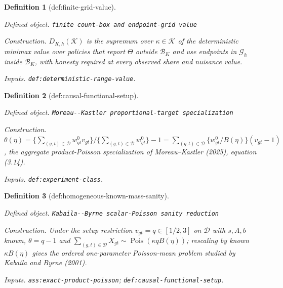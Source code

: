 \documentclass{article}
\newtheorem{definition}{Definition}
\begin{document}
\begin{definition}[def:finite-grid-value]\label{def:finite-grid-value}
\par\smallskip\noindent\emph{Defined object.} \texttt{finite count-\allowbreak{}box and endpoint-\allowbreak{}grid value}
\par\smallskip\noindent\emph{Construction.} \(D_{K,h}(\mathcal K)\) is the supremum over \(\kappa\in\mathcal K\) of the deterministic minimax value over policies that report \(\Theta\) outside \(\mathcal B_K\) and use endpoints in \(\mathcal G_h\) inside \(\mathcal B_K\), with honesty required at every observed share and nuisance value.
\par\smallskip\noindent\emph{Inputs.} \texttt{def:\allowbreak{}deterministic-\allowbreak{}range-\allowbreak{}value}.
\end{definition}

\begin{definition}[def:causal-functional-setup]\label{def:causal-functional-setup}
\par\smallskip\noindent\emph{Defined object.} \texttt{Moreau-\allowbreak{}-\allowbreak{}Kastler proportional-\allowbreak{}target specialization}
\par\smallskip\noindent\emph{Construction.} \(\theta(\eta)=\{\sum_{(g,t)\in\mathcal D}w^0_{gt}v_{gt}\}/\{\sum_{(g,t)\in\mathcal D}w^0_{gt}\}-1=\sum_{(g,t)\in\mathcal D}\{w^0_{gt}/B(\eta)\}(v_{gt}-1)\), the aggregate product-Poisson specialization of Moreau--Kastler (2025), equation (3.14).
\par\smallskip\noindent\emph{Inputs.} \texttt{def:\allowbreak{}experiment-\allowbreak{}class}.
\end{definition}

\begin{definition}[def:homogeneous-known-mass-sanity]\label{def:homogeneous-known-mass-sanity}
\par\smallskip\noindent\emph{Defined object.} \texttt{Kabaila-\allowbreak{}-\allowbreak{}Byrne scalar-\allowbreak{}Poisson sanity reduction}
\par\smallskip\noindent\emph{Construction.} Under the setup restriction \(v_{gt}=q\in[1/2,3]\) on \(\mathcal D\) with \(s,A,b\) known, \(\theta=q-1\) and \(\sum_{(g,t)\in\mathcal D}X_{gt}\sim\operatorname{Pois}(\kappa qB(\eta))\); rescaling by known \(\kappa B(\eta)\) gives the ordered one-parameter Poisson-mean problem studied by Kabaila and Byrne (2001).
\par\smallskip\noindent\emph{Inputs.} \texttt{ass:\allowbreak{}exact-\allowbreak{}product-\allowbreak{}poisson}; \texttt{def:\allowbreak{}causal-\allowbreak{}functional-\allowbreak{}setup}.
\end{definition}
\end{document}
